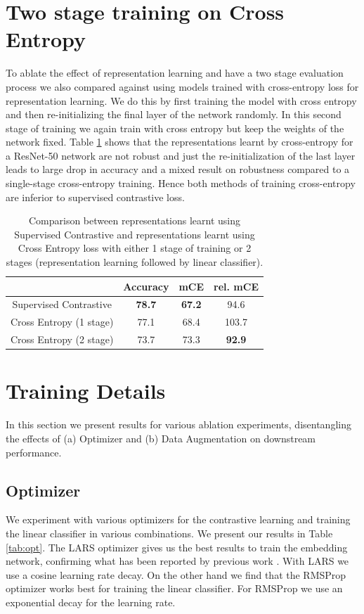 \section{Two stage training on Cross Entropy}
To ablate the effect of representation learning and have a two stage evaluation process we also compared against using models trained with cross-entropy loss for representation learning. We do this by first training the model with cross entropy and then re-initializing the final layer of the network randomly. In this second stage of training we again train with cross entropy but keep the weights of the network fixed. Table \ref{table:xenthead} shows that the representations learnt by cross-entropy for a ResNet-50 network are not robust and just the re-initialization of the last layer leads to large drop in accuracy and a mixed result on robustness compared to a single-stage cross-entropy training. Hence both methods of training cross-entropy are inferior to supervised contrastive loss.

\begin{table}[ht]
    \centering
    \begin{tabular}{cccc}\toprule
         & Accuracy & mCE & rel. mCE  \\\midrule
        Supervised Contrastive & {\bf 78.7} & {\bf 67.2} & 94.6 \\
        Cross Entropy (1 stage) & 77.1 & 68.4 & 103.7  \\
        Cross Entropy (2 stage) & 73.7 & 73.3 & {\bf 92.9} \\\bottomrule
    \end{tabular}
    \caption{Comparison between representations learnt using Supervised Contrastive and representations learnt using Cross Entropy loss with either 1 stage of training or 2 stages (representation learning followed by linear classifier).}
    \label{table:xenthead}
\end{table}

\section{Training Details}
In this section we present results for various ablation experiments, disentangling the effects of (a) Optimizer and (b) Data Augmentation on downstream performance.
\subsection{Optimizer}
We experiment with various optimizers for the contrastive learning and training the linear classifier in various combinations. We present our results in Table \ref{tab:opt}. The LARS optimizer \cite{you2017large} gives us the best results to train the embedding network, confirming what has been reported by previous work \cite{chen2020simple}. With LARS we use a cosine learning rate decay. On the other hand we find that the RMSProp optimizer \cite{tieleman2012lecture} works best for training the linear classifier. For RMSProp we use an exponential decay for the learning rate. 

